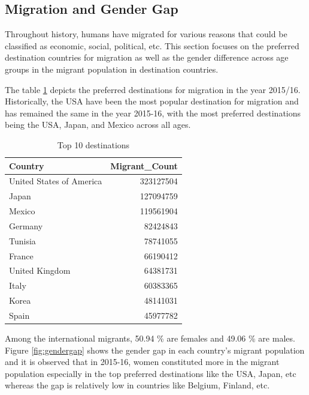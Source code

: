 \documentclass[11pt,a4paper,]{article}
\begin{document}
\subsection*{Migration and Gender Gap}

Throughout history, humans have migrated for various reasons that could be classified as economic, social, political, etc. This section focuses on the preferred destination countries for migration as well as the gender difference across age groups in the migrant population in destination countries.

The table \ref{tab:topdestinations} depicts the preferred destinations for migration in the year 2015/16. Historically, the USA have been the most popular destination for migration and has remained the same in the year 2015-16, with the most preferred destinations being the USA, Japan, and Mexico across all ages.

\begin{table}

\caption{\label{tab:topdestinations}Top 10 destinations}
\centering
\begin{tabular}[t]{lr}
\toprule
Country & Migrant\_Count\\
\midrule
\rowcolor{gray!6}  United States of America & 323127504\\
Japan & 127094759\\
\rowcolor{gray!6}  Mexico & 119561904\\
Germany & 82424843\\
\rowcolor{gray!6}  Tunisia & 78741055\\
\addlinespace
France & 66190412\\
\rowcolor{gray!6}  United Kingdom & 64381731\\
Italy & 60383365\\
\rowcolor{gray!6}  Korea & 48141031\\
Spain & 45977782\\
\bottomrule
\end{tabular}
\end{table}

Among the international migrants, 50.94 \% are females and 49.06 \% are males. Figure \ref{fig:gendergap} shows the gender gap in each country's migrant population and it is observed that in 2015-16, women constituted more in the migrant population especially in the top preferred destinations like the USA, Japan, etc whereas the gap is relatively low in countries like Belgium, Finland, etc.
\end{document}
